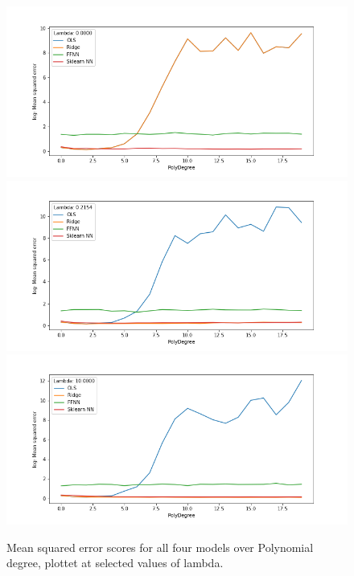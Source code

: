 \documentclass[reprint,english,notitlepage]{revtex4-2}  %
\begin{document}
\begin{figure}[!htb]
	\includegraphics[trim=75 70 0 0, scale=0.3]{NNReg1}
	\includegraphics[trim=75 70 0 0, scale=0.3]{NNReg2}
	\includegraphics[trim=75 50 0 0, scale=0.3]{NNReg3}
	\caption{Mean squared error scores for all four models over Polynomial degree, plottet at selected values of lambda. }\label{figure}
	
\end{figure}
\end{document}
